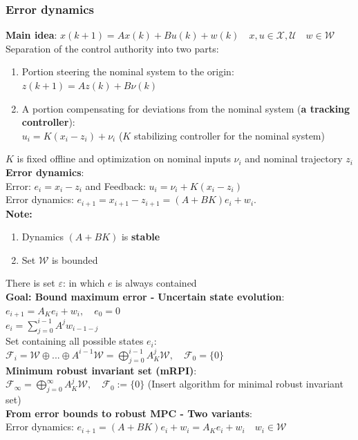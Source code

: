 \subsubsection{Error dynamics}
\textbf{Main idea}: $x(k+1)=Ax(k)+Bu(k)+w(k)\quad x,u\in\mathcal{X},\mathcal{U}\quad w\in\mathcal{W}$\\
Separation of the control authority into two parts:
\begin{enumerate}
    \item Portion steering the nominal system to the origin:\\
    $z(k+1)=Az(k)+B\nu(k)$
    \item A portion compensating for deviations from the nominal system (\textbf{a tracking controller}):\\
    $u_i=K(x_i-z_i)+\nu_i$ ($K$ stabilizing controller for the nominal system)
\end{enumerate}
\Rightarrow $K$ is fixed offline and optimization on nominal inputs $\nu_i$ and nominal trajectory $z_i$\\ 
\textbf{Error dynamics}:\\
Error: $e_i=x_i-z_i$ and Feedback: $u_i=\nu_i+K(x_i-z_i)$\\
\rightarrow Error dynamics: $e_{i+1}=x_{i+1}-z_{i+1}
=(A+BK)e_i+w_i$.\\
\textbf{Note:}
\begin{enumerate}
    \item Dynamics $(A+BK)$ is \textbf{stable}
    \item Set $\mathcal{W}$ is bounded
\end{enumerate}
\rightarrow There is set $\varepsilon$: in which $e$ is always contained\\
\textbf{Goal: Bound maximum error -} 
\textbf{Uncertain state evolution}: $e_{i+1}=A_Ke_i+w_i,\quad e_0=0$\\
$e_i=\sum_{j=0}^{i-1}A^{j}w_{i-1-j}$\\
Set containing all possible states $e_i$:
$\mathcal{F}_i=\mathcal{W}\oplus...\oplus A^{i-1}\mathcal{W}=\bigoplus_{j=0}^{i-1}A_K^{j}\mathcal{W},\quad \mathcal{F}_0=\{0\}$\\
\textbf{Minimum robust invariant set (mRPI)}:\\
$\mathcal{F}_\infty=\bigoplus_{j=0}^\infty A_K^j\mathcal{W},\quad \mathcal{F}_0:=\{0\}$
(Insert algorithm for minimal robust invariant set)\\
\textbf{From error bounds to robust MPC - Two variants}:\\
Error dynamics: $e_{i+1}=(A+BK)e_i+w_i=A_Ke_i+w_i\quad w_i\in\mathcal{W}$
